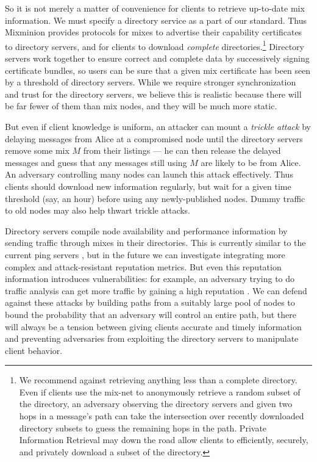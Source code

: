 \documentclass[final,inpress,inline]{ieee}
\begin{document}
So it is not merely a matter of convenience for clients to retrieve
up-to-date mix information.
We must specify a directory
service as a part of our standard. Thus Mixminion provides protocols for
mixes to advertise their capability certificates to directory servers,
and for clients to download \emph{complete} directories.\footnote{
  We recommend against retrieving anything less than a complete directory.
  Even if clients use the mix-net to anonymously retrieve a random
  subset of the directory, an adversary observing the directory servers
  and given two hops in a message's path can take the intersection over
  recently downloaded directory subsets to guess the remaining hops in
  the path. Private Information Retrieval \cite{malkin-thesis} may down
  the road allow clients to efficiently, securely, and privately download
  a subset of the directory.
}
Directory servers work together to ensure correct and complete data by
successively signing certificate bundles, so users can be sure that a
given mix certificate has been seen by a threshold of directory servers.
While we require stronger synchronization and trust for the directory
servers, we believe this is realistic because there will be far fewer
of them than mix nodes, and they will be much more static.

But even if client knowledge is uniform, an attacker can mount a
\emph{trickle attack} by delaying messages from Alice at a compromised
node until the directory servers remove some mix $M$ from their listings
--- he can then release the delayed messages and guess that any messages
still using $M$ are likely to be from Alice. An adversary controlling
many nodes can launch this attack effectively. Thus clients
should download new information regularly,
but wait for a given time threshold (say, an hour) before using any
newly-published nodes. Dummy traffic to old nodes may also 
help thwart trickle attacks.

Directory servers compile node availability and performance information by
sending traffic through mixes in their directories. This is currently
similar to the current ping servers \cite{levien}, but in the
future we can investigate integrating more complex and attack-resistant
reputation metrics.  But even this reputation information introduces
vulnerabilities: for example, an adversary 
trying to do traffic analysis
can get more traffic by gaining a high reputation \cite{mix-acc}. We can
defend against these attacks by building paths from a suitably large pool
of nodes \cite{casc-rep} to bound the probability that an adversary will
control an entire path, but there will always be a tension between giving
clients accurate and timely information and preventing adversaries from
exploiting the directory servers to manipulate client behavior.
\end{document}
